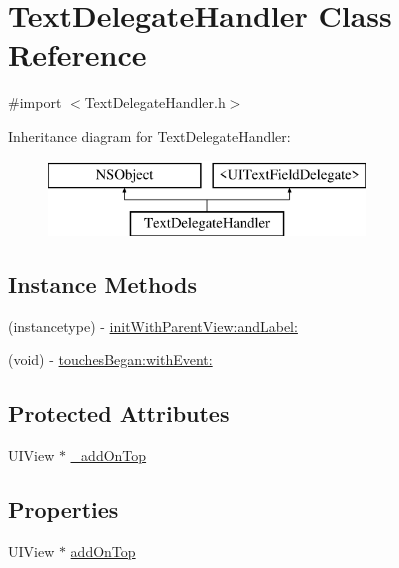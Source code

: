 \hypertarget{interface_text_delegate_handler}{}\section{Text\+Delegate\+Handler Class Reference}
\label{interface_text_delegate_handler}


{\ttfamily \#import $<$Text\+Delegate\+Handler.\+h$>$}

Inheritance diagram for Text\+Delegate\+Handler\+:\begin{figure}[H]
\begin{center}
\leavevmode
\includegraphics[height=2.000000cm]{interface_text_delegate_handler}
\end{center}
\end{figure}
\subsection*{Instance Methods}
\begin{DoxyCompactItemize}
\item 
(instancetype) -\/ \hyperlink{interface_text_delegate_handler_a2e1a7bea6b217ef07429a92c93bb870c}{init\+With\+Parent\+View\+:and\+Label\+:}
\item 
(void) -\/ \hyperlink{interface_text_delegate_handler_adb2ecf511386cff2aec6c0e52c3aa4bc}{touches\+Began\+:with\+Event\+:}
\end{DoxyCompactItemize}
\subsection*{Protected Attributes}
\begin{DoxyCompactItemize}
\item 
U\+I\+View $\ast$ \hyperlink{interface_text_delegate_handler_ad41af34d62ab741db728a7c0970064e8}{\+\_\+add\+On\+Top}
\end{DoxyCompactItemize}
\subsection*{Properties}
\begin{DoxyCompactItemize}
\item 
U\+I\+View $\ast$ \hyperlink{interface_text_delegate_handler_a8b6cfe02ace3ba068f5e9db1d7d26815}{add\+On\+Top}
\end{DoxyCompactItemize}


